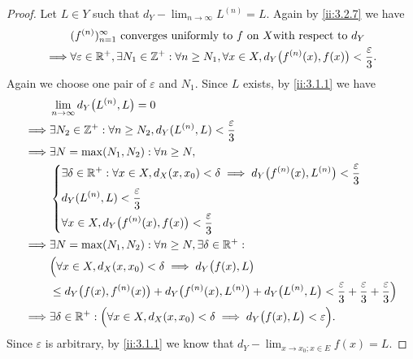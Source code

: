 \begin{proof}
  Let \(L \in Y\) such that \(d_Y - \lim_{n \to \infty} L^{(n)} = L\).
  Again by \cref{ii:3.2.7} we have
  \begin{align*}
             & (f^{(n)})_{n = 1}^\infty \text{ converges uniformly to } f \text{ on } X \text{with respect to } d_Y                                              \\
    \implies & \forall \varepsilon \in \mathbb{R}^+, \exists N_1 \in \mathbb{Z}^+ : \forall n \geq N_1, \forall x \in X, d_Y\big(f^{(n)}(x), f(x)\big) < \dfrac{\varepsilon}{3}.
  \end{align*}
  Again we choose one pair of \(\varepsilon\) and \(N_1\).
  Since \(L\) exists, by \cref{ii:3.1.1} we have
  \begin{align*}
             & \lim_{n \to \infty} d_Y\big(L^{(n)}, L\big) = 0                                                                                                                                 \\
    \implies & \exists N_2 \in \mathbb{Z}^+ : \forall n \geq N_2, d_Y(L^{(n)}, L) < \dfrac{\varepsilon}{3}                                                                                             \\
    \implies & \exists N = \max(N_1, N_2) : \forall n \geq N,                                                                                                                                  \\
             & \begin{dcases}
                 \exists \delta \in \mathbb{R}^+ : \forall x \in X, d_X(x, x_0) < \delta \implies d_Y\big(f^{(n)}(x), L^{(n)}\big) < \dfrac{\varepsilon}{3} \\
                 d_Y(L^{(n)}, L) < \dfrac{\varepsilon}{3}                                                                                           \\
                 \forall x \in X, d_Y\big(f^{(n)}(x), f(x)\big) < \dfrac{\varepsilon}{3}
               \end{dcases}                                              \\
    \implies & \exists N = \max(N_1, N_2) : \forall n \geq N, \exists \delta \in \mathbb{R}^+ :                                                                                                        \\
             & \Big(\forall x \in X, d_X(x, x_0) < \delta \implies d_Y\big(f(x), L\big)                                                                                                        \\
             & \leq d_Y\big(f(x), f^{(n)}(x)\big) + d_Y\big(f^{(n)}(x), L^{(n)}\big) + d_Y\big(L^{(n)}, L\big) < \dfrac{\varepsilon}{3} + \dfrac{\varepsilon}{3} + \dfrac{\varepsilon}{3}\Big) \\
    \implies & \exists \delta \in \mathbb{R}^+ : \Big(\forall x \in X, d_X(x, x_0) < \delta \implies d_Y\big(f(x), L\big) < \varepsilon\Big).
  \end{align*}
  Since \(\varepsilon\) is arbitrary, by \cref{ii:3.1.1} we know that \(d_Y - \lim_{x \to x_0 ; x \in E} f(x) = L\).
\end{proof}

